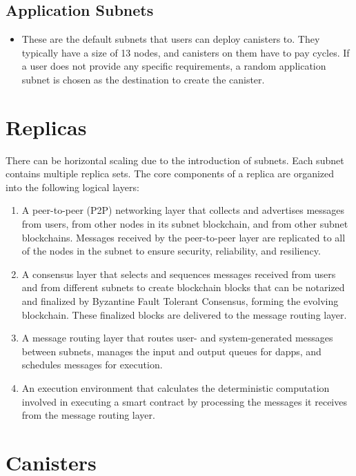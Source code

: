 \subsection{Application Subnets}

\begin{itemize}
  \item These are the default subnets that users can deploy canisters to. They typically have a size of 13 nodes, and canisters on them have to pay cycles. If a user does not provide any specific requirements, a random application subnet is chosen as the destination to create the canister.
\end{itemize}

\section{Replicas}

There can be horizontal scaling due to the introduction of subnets. Each subnet contains multiple replica sets. The core components of a replica are organized into the following logical layers:

\begin{enumerate}
  \item A peer-to-peer (P2P) networking layer that collects and advertises messages from users, from other nodes in its subnet blockchain, and from other subnet blockchains. Messages received by the peer-to-peer layer are replicated to all of the nodes in the subnet to ensure security, reliability, and resiliency.
  \item A consensus layer that selects and sequences messages received from users and from different subnets to create blockchain blocks that can be notarized and finalized by Byzantine Fault Tolerant Consensus, forming the evolving blockchain. These finalized blocks are delivered to the message routing layer.
  \item A message routing layer that routes user- and system-generated messages between subnets, manages the input and output queues for dapps, and schedules messages for execution.
  \item An execution environment that calculates the deterministic computation involved in executing a smart contract by processing the messages it receives from the message routing layer.
\end{enumerate}

\section{Canisters}

